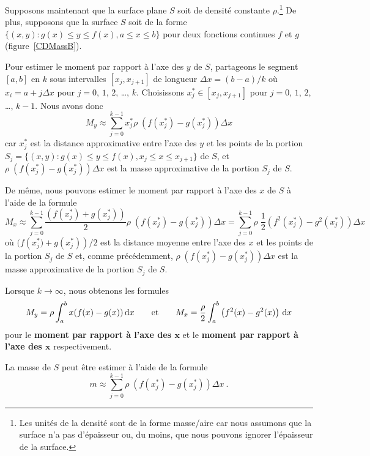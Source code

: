 {Supposons maintenant que la surface plane $S$ soit de densité
constante $\rho$.\footnote{Les unités de la densité sont de la forme
masse/aire car nous assumons que la surface n'a pas d'épaisseur ou, du
moins, que nous pouvons ignorer l'épaisseur de la surface.}
De plus, supposons que la surface $S$ soit de la forme
$\{ (x,y) : g(x) \leq y \leq f(x) , a \leq x \leq b\}$ pour deux
fonctions continues $f$ et $g$ (figure~\ref{CDMassB}).


Pour estimer le moment par rapport à l'axe des $y$ de $S$, partageons
le segment $[a,b]$ en $k$ sous intervalles $[x_j,x_{j+1}]$ de longueur
$\Delta x = (b-a)/k$ où $x_i = a + j \Delta x$ pour $j=0$, $1$, $2$,
\ldots , $k$.  Choisissons $x_j^\ast \in [x_j,x_{j+1}]$ pour $j=0$,
$1$, $2$, \ldots , $k-1$.  Nous avons donc
\[
  M_y \approx \sum_{j=0}^{k-1} x_j^\ast \rho\;
  \left( f(x_j^\ast) - g(x_j^\ast)\right) \Delta x
\]
car $x_j^\ast$ est la distance
approximative entre l'axe des $y$ et les points de la portion
$S_j = \{ (x,y) : g(x) \leq y \leq f(x) , x_j \leq x \leq x_{j+1}\}$
de $S$,
et $\rho \;\left(f(x_j^\ast) - g(x_j^\ast)\right) \Delta x$ est la masse
approximative de la portion $S_j$ de $S$.

De même, nous pouvons estimer le moment par rapport à l'axe des $x$ de $S$ à
l'aide de la formule
\[
M_x \approx \sum_{j=0}^{k-1} \frac{(f(x_j^\ast)+g(x_j^\ast))}{2}
\rho\; \left(f(x_j^\ast) - g(x_j^\ast)\right) \Delta x =
\sum_{j=0}^{k-1}\rho\; \frac{1}{2}
\left( f^2(x_j^\ast)-g^2(x_j^\ast)\right) \Delta x
\]
où $(f\left(x_j^\ast)+g(x_j^\ast)\right)/2$ est la distance moyenne
entre l'axe des $x$ et les points de la portion $S_j$ de $S$ et, comme
précédemment, $\rho\; \left(f(x_j^\ast) - g(x_j^\ast)\right) \Delta x$
est la masse approximative de la portion $S_j$ de $S$.

Lorsque $k\to \infty$, nous obtenons les formules
\[
M_y = \rho \int_a^b x(f(x)-g(x)) \,\mathrm{d}x \qquad \text{et} \qquad
M_x = \frac{\rho}{2} \int_a^b \left(f^2(x)-g^2(x) \right) \,\mathrm{d}x
\]
pour le
{\bfseries moment par rapport à l'axe des $\mathbf x$} et le 
{\bfseries moment par rapport à l'axe des $\mathbf x$} respectivement.

La masse de $S$ peut être estimer à l'aide de la formule
\[
  m \approx \sum_{j=0}^{k-1} \rho\;
  \left(f(x_j^\ast) - g(x_j^\ast)\right) \Delta x \ .
\]

}
